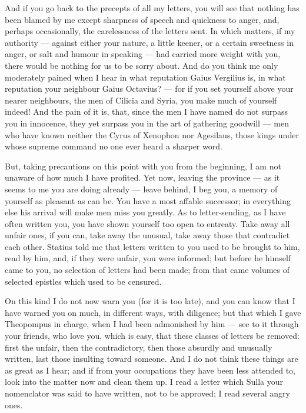  And if you go back to the precepts of all my letters, you will see that nothing has been blamed by me except sharpness of speech and quickness to anger, and, perhaps occasionally, the carelessness of the letters sent. In which matters, if my authority --- against either your nature, a little keener, or a certain sweetness in anger, or salt and humour in speaking --- had carried more weight with you, there would be nothing for us to be sorry about. And do you think me only moderately pained when I hear in what reputation Gaius Vergilius is, in what reputation your neighbour Gaius Octavius? --- for if you set yourself above your nearer neighbours, the men of Cilicia and Syria, you make much of yourself indeed! And the pain of it is, that, since the men I have named do not surpass you in innocence, they yet surpass you in the art of gathering goodwill --- men who have known neither the Cyrus of Xenophon nor Agesilaus, those kings under whose supreme command no one ever heard a sharper word.

 But, taking precautions on this point with you from the beginning, I am not unaware of how much I have profited. Yet now, leaving the province --- as it seems to me you are doing already --- leave behind, I beg you, a memory of yourself as pleasant as can be. You have a most affable successor; in everything else his arrival will make men miss you greatly. As to letter-sending, as I have often written you, you have shown yourself too open to entreaty. Take away all unfair ones, if you can, take away the unusual, take away those that contradict each other. Statius told me that letters written to you used to be brought to him, read by him, and, if they were unfair, you were informed; but before he himself came to you, no selection of letters had been made; from that came volumes of selected epistles which used to be censured.

 On this kind I do not now warn you (for it is too late), and you can know that I have warned you on much, in different ways, with diligence; but that which I gave Theopompus in charge, when I had been admonished by him --- see to it through your friends, who love you, which is easy, that these classes of letters be removed: first the unfair, then the contradictory, then those absurdly and unusually written, last those insulting toward someone. And I do not think these things are as great as I hear; and if from your occupations they have been less attended to, look into the matter now and clean them up. I read a letter which Sulla your nomenclator was said to have written, not to be approved; I read several angry ones.

